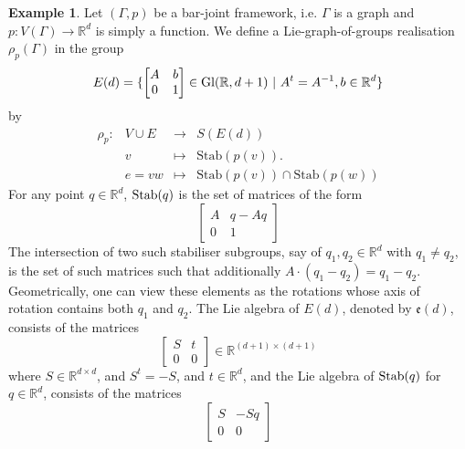\documentclass{article}
\theoremstyle{definition}
\newtheorem{example}[theorem]{Example}
\theoremstyle{remark}
\newcommand{\Stab}{\textup{Stab}}
\begin{document}
\begin{example}\label{ex: se(d)}
    Let $(\Gamma, p)$ be a bar-joint framework, i.e. $\Gamma$ is a graph and $p: V(\Gamma) \rightarrow \mathbb{R}^{d}$ is simply a function. We define a Lie-graph-of-groups realisation $\rho_{p}(\Gamma)$ in the group $$E(d) = \{\begin{bmatrix}
        A & b \\
        0 &1
    \end{bmatrix}\in \textup{Gl}(\mathbb{R}, d+1) ~\vert~ A^{t}=A^{-1}, b\in \mathbb{R}^{d}\}$$ by
    \begin{equation*}
    \begin{array}{rccl}
    \rho_p:& V\cup E &\rightarrow &S(E(d))\\ 
    &v&\mapsto &\text{Stab}(p(v)).\\
    &e=vw&\mapsto &\text{Stab}(p(v)) \cap \text{Stab}(p(w))
    \end{array}
    \end{equation*}
    For any point $q \in \mathbb{R}^{d}$, $\Stab(q)$ is the set of matrices of the form
    \begin{equation*}
    \begin{bmatrix}
        A & q - A q\\
        0 & 1
    \end{bmatrix}
    \end{equation*}
    The intersection of two such stabiliser subgroups, say of $q_1, q_2\in \mathbb{R}^{d}$ with $q_1 \neq q_2$, is the set of such matrices such that additionally $A\cdot (q_1 - q_2)= q_1 - q_2$. Geometrically, one can view these elements as the rotations whose axis of rotation contains both $q_1$ and $q_2$. 
    The Lie algebra of $E(d)$, denoted by $\mathfrak{e}(d)$, consists of the matrices 
    \begin{equation*}
    \begin{bmatrix}
    S & t\\
    0 & 0
    \end{bmatrix}\in \mathbb{R}^{(d+1) \times (d+1)}
    \end{equation*}
    where $S\in \mathbb{R}^{d \times d}$, and $S^{t} = - S$, and $t\in \mathbb{R}^{d}$, and the Lie algebra of  $\Stab(q)$ for $q\in \mathbb{R}^d$, consists of the matrices
    \begin{equation*}
    \begin{bmatrix}
    S & -Sq \\
    0 & 0
    \end{bmatrix}
    \end{equation*}

\end{example}
\end{document}
